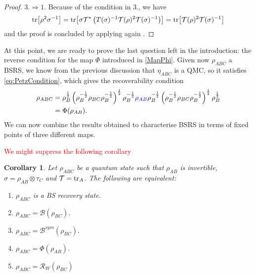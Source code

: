 \documentclass[11pt]{article}
\theoremstyle{newdefinition}
\theoremstyle{newplain}
\newtheorem{corollary}[definition]{Corollary}
\theoremstyle{myplain}
\DeclareMathOperator{\1}{\mathds{1}}
\newcommand{\PCR}[1]{{\color{blue}#1}}
\begin{document}
{\begin{proof}
 \noindent  \underline{$3. \Rightarrow 1. $}  Because of the condition in 3., we have 
    \begin{equation}
        \tr[\rho^2 \sigma^{-1}] = \tr[\sigma \mathcal{T}^\ast\left(T(\sigma)^{-1} \mathcal{T}(\rho)^2 \mathcal{T}(\sigma)^{-1}\right)] = \tr[\mathcal{T}(\rho)^2 \mathcal{T}(\sigma)^{-1}]
    \end{equation}
    and the proof is concluded by applying again \cite[Theorem 3.34]{HiaiMosonyi-f-divergences-2017}.
     
\end{proof}


At this point, we are ready to prove the last question left in the introduction: the reverse condition for the map $\Phi$ introduced in \eqref{MapPhi}. Given now $\rho_{ABC}$ a BSRS, we know from the previous discussion that $\eta_{ABC}$ is a QMC, so it satisfies \eqref{eq:PetzCondition}, which  gives the recoverability condition 
\begin{subequations}
\begin{align}
    \rho_{ABC}&=\rho_B^{\frac{1}{2}}\left( \rho_B^{-\frac{1}{2}}\rho_{BC}\rho_B^{-\frac{1}{2}}   \right)^{\frac{1}{2}}\rho_B^{-\frac{1}{2}}\PCR{ \rho_{AB}}\rho_B^{-\frac{1}{2}}\left( \rho_B^{-\frac{1}{2}}\rho_{BC}\rho_B^{-\frac{1}{2}}   \right)^{\frac{1}{2}}\rho_B^{\frac{1}{2}}\\
    &=\Phi(\rho_{AB}).
\end{align}
\end{subequations}
We can now combine the results obtained to characterise BSRS in terms of fixed points of three different maps.

\textcolor{red}{We might suppress the following corollary}

\begin{corollary}\label{cor:equiv_conditions_BSRS}
    Let $\rho_{ABC}$ be a quantum state such that $\rho_{AB}$ is invertible, $\sigma=\rho_{AB}\otimes \tau_C$ and $\mathcal{T}=\tr_A$. The following are equivalent:
    \begin{enumerate}
        \item $\rho_{ABC}$ is a BS recovery state.
        \item $\rho_{ABC}=\mathcal{B}(\rho_{BC})$.
        \item $\rho_{ABC}=\mathcal{B}^{sym}(\rho_{BC})$.
        \item $\rho_{ABC}=\Phi(\rho_{AB})$.
        \item \PCR{$\rho_{ABC}=\mathcal{R}_W(\rho_{BC})$}
    \end{enumerate}
\end{corollary}

}
\end{document}
